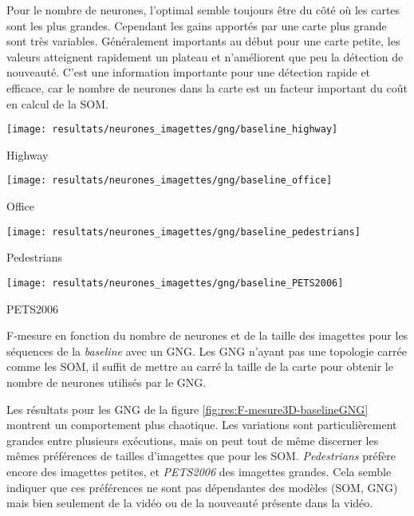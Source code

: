 	Pour le nombre de neurones, l'optimal semble toujours être du côté où les cartes sont les plus grandes. Cependant les gains apportés par une carte plus grande sont très variables. Généralement importants au début pour une carte petite, les valeurs atteignent rapidement un plateau et n'améliorent que peu la détection de nouveauté. C'est une information importante pour une détection rapide et efficace, car le nombre de neurones dans la carte est un facteur important du coût en calcul de la SOM.

	\begin{figureth}
		\begin{subfigureth}{.45\textwidth}
			\texttt{[image: resultats/neurones\_imagettes/gng/baseline\_highway]}\caption{Highway}
		\end{subfigureth}
		\begin{subfigureth}{.45\textwidth}
			\texttt{[image: resultats/neurones\_imagettes/gng/baseline\_office]}\caption{Office}
		\end{subfigureth}
		\begin{subfigureth}{.45\textwidth}
			\texttt{[image: resultats/neurones\_imagettes/gng/baseline\_pedestrians]}\caption{Pedestrians}
		\end{subfigureth}
		\begin{subfigureth}{.45\textwidth}
			\texttt{[image: resultats/neurones\_imagettes/gng/baseline\_PETS2006]}\caption{PETS2006}
		\end{subfigureth}
		\caption[Nombre de neurones et de taille des imagettes, GNG/baseline]{F-mesure en fonction du nombre de neurones et de la taille des imagettes pour les séquences de la \textit{baseline} avec un GNG. Les GNG n'ayant pas une topologie carrée comme les SOM, il suffit de mettre au carré la taille de la carte pour obtenir le nombre de neurones utilisés par le GNG.}\label{fig:res:F-mesure3D-baselineGNG}
	\end{figureth}

	Les résultats pour les GNG de la figure \ref{fig:res:F-mesure3D-baselineGNG} montrent un comportement plus chaotique. Les variations sont particulièrement grandes entre plusieurs exécutions, mais on peut tout de même discerner les mêmes préférences de tailles d'imagettes que pour les SOM. \textit{Pedestrians} préfère encore des imagettes petites, et \textit{PETS2006} des imagettes grandes. Cela semble indiquer que ces préférences ne sont pas dépendantes des modèles (SOM, GNG) mais bien seulement de la vidéo ou de la nouveauté présente dans la vidéo.

